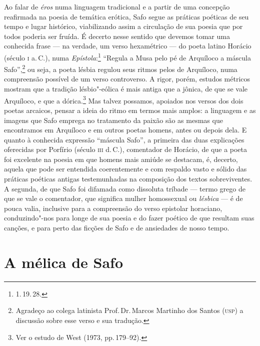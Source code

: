 Ao falar de \emph{éros} numa linguagem tradicional e a partir de uma concepção
reafirmada na poesia de temática erótica, Safo segue as práticas poéticas de
seu tempo e lugar histórico, viabilizando assim a circulação de sua poesia
que por todos poderia ser fruída. É decerto nesse sentido que
devemos tomar uma conhecida frase --- na verdade, um verso hexamétrico --- do poeta
latino Horácio (século \textsc{i} a.\,C.), numa \emph{Epístola}:\footnote{1.\,19.\,28.}
``Regula a Musa pelo pé de Arquíloco a máscula Safo”,\footnote{ Agradeço
ao colega latinista Prof.\,Dr.\,Marcos Martinho dos Santos (\textsc{usp}) a discussão sobre esse verso e
sua tradução.} ou seja, a poeta lésbia regulou seus ritmos pelos de Arquíloco,
numa compreensão possível de um verso controverso. A rigor, porém,
estudos métricos mostram que a tradição lésbio"-eólica é mais antiga que a
jônica, de que se vale Arquíloco, e que a dórica.\footnote{ Ver o estudo de West
(1973, pp.\,179--92).} Mas talvez possamos, apoiados nos versos dos dois poetas
arcaicos, pensar a ideia do ritmo em termos mais amplos: a linguagem e
as imagens que Safo emprega no tratamento da paixão são as mesmas que
encontramos em Arquíloco e em outros poetas homens, antes ou depois dela. E
quanto à conhecida expressão ``máscula Safo”, a primeira das duas
explicações oferecidas por Porfírio (século \textsc{iii} d.\,C.), comentador de Horácio,
de que a poeta foi excelente na poesia em que homens mais amiúde se
destacam, é, decerto, aquela que pode ser entendida coerentemente e com
respaldo vasto e sólido das práticas poéticas antigas testemunhadas na
composição dos textos sobreviventes. A segunda, de que Safo foi difamada como
dissoluta tríbade --- termo grego de que se vale o comentador, que significa
mulher homossexual ou \emph{lésbica} --- é de pouca valia, inclusive para a
compreensão do verso epistolar horaciano, conduzindo"-nos para longe de sua
poesia e do fazer poético de que resultam suas canções, e para perto das
ficções de Safo e de ansiedades de nosso tempo. 


\section*{A mélica de Safo}


